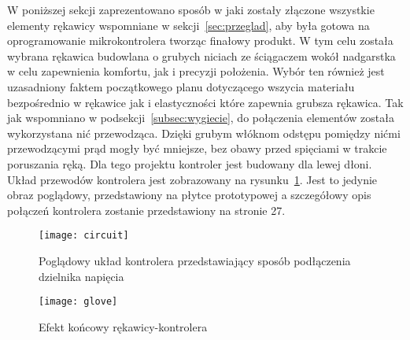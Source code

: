 W poniższej sekcji zaprezentowano sposób w jaki zostały złączone wszystkie elementy rękawicy wspomniane w sekcji~\ref{sec:przeglad}, aby była gotowa na oprogramowanie mikrokontrolera tworząc finałowy produkt. W tym celu została wybrana rękawica budowlana o grubych niciach ze ściągaczem wokół nadgarstka w celu zapewnienia komfortu, jak i precyzji położenia. Wybór ten również jest uzasadniony faktem początkowego planu dotyczącego wszycia materiału bezpośrednio w rękawice jak i elastyczności które zapewnia grubsza rękawica. Tak jak wspomniano w podsekcji~\ref{subsec:wygiecie}, do połączenia elementów została wykorzystana nić przewodząca. Dzięki grubym włóknom odstępu pomiędzy nićmi przewodzącymi prąd mogły być mniejsze, bez obawy przed spięciami w trakcie poruszania ręką. Dla tego projektu kontroler jest budowany dla lewej dłoni. Układ przewodów kontrolera jest zobrazowany na rysunku~\ref{fig:circuit}. Jest to jedynie obraz poglądowy, przedstawiony na płytce prototypowej a szczegółowy opis połączeń kontrolera zostanie przedstawiony na stronie 27.

\begin{figure}[h]
\centering
\texttt{[image: circuit]}
\caption{Poglądowy układ kontrolera przedstawiający sposób podłączenia dzielnika napięcia~\cite{r3}}
\label{fig:circuit}
\end{figure}

\begin{figure}[h]
\centering
\texttt{[image: glove]}
\caption{Efekt końcowy rękawicy-kontrolera}
\label{fig:glove}
\end{figure}

